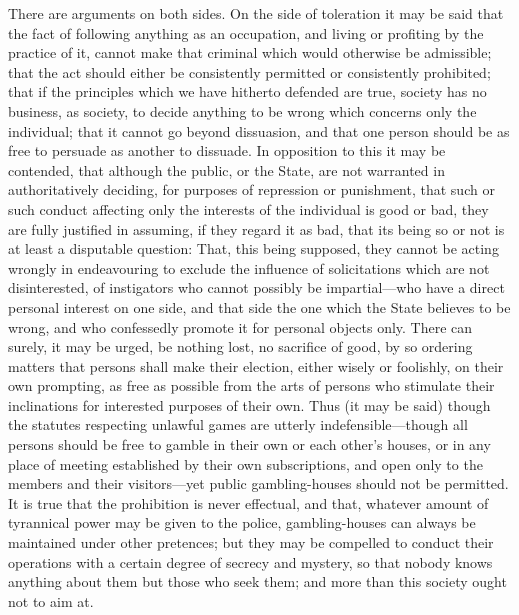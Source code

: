 \documentclass[11pt,openany]{book}
\begin{document}
There are arguments on both sides. On the side of toleration it may be said that the fact of following anything as an occupation, and living or profiting by the practice of it, cannot make that criminal which would otherwise be admissible; that the act should either be consistently permitted or consistently prohibited; that if the principles which we have hitherto defended are true, society has no business, as society, to decide anything to be wrong which concerns only the individual; that it cannot go beyond dissuasion, and that one person should be as free to persuade as another to dissuade. In opposition to this it may be contended, that although the public, or the State, are not warranted in authoritatively deciding, for purposes of repression or punishment, that such or such conduct affecting only the interests of the individual is good or bad, they are fully justified in assuming, if they regard it as bad, that its being so or not is at least a disputable question: That, this being supposed, they cannot be acting wrongly in endeavouring to exclude the influence of solicitations which are not disinterested, of instigators who cannot possibly be impartial---who have a direct personal interest on one side, and that side the one which the State believes to be wrong, and who confessedly promote it for personal objects only. There can surely, it may be urged, be nothing lost, no sacrifice of good, by so ordering matters that persons shall make their election, either wisely or foolishly, on their own prompting, as free as possible from the arts of persons who stimulate their inclinations for interested purposes of their own. Thus (it may be said) though the statutes respecting unlawful games are utterly indefensible---though all persons should be free to gamble in their own or each other's houses, or in any place of meeting established by their own subscriptions, and open only to the members and their visitors---yet public gambling-houses should not be permitted. It is true that the prohibition is never effectual, and that, whatever amount of tyrannical power may be given to the police, gambling-houses can always be maintained under other pretences; but they may be compelled to conduct their operations with a certain degree of secrecy and mystery, so that nobody knows anything about them but those who seek them; and more than this society ought not to aim at.
\end{document}
